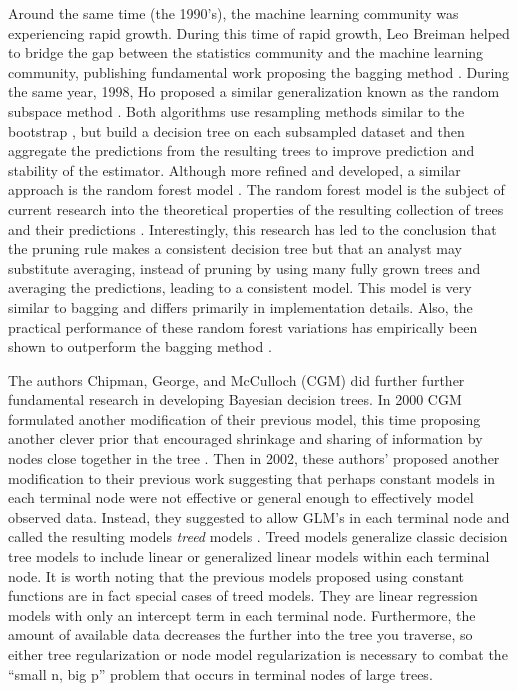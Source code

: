 Around the same time (the 1990's), the machine learning community was experiencing rapid growth. During this time of rapid growth, Leo Breiman helped to bridge the gap between the statistics community and the machine learning community, publishing fundamental work proposing the bagging method \cite{breiman1996bagging}. During the same year, 1998, Ho proposed a similar generalization known as the random subspace method \cite{ho1998random}. Both algorithms use resampling methods similar to the bootstrap \cite{efron1997improvements,efron1994introduction}, but build a decision tree on each subsampled dataset and then aggregate the predictions from the resulting trees to improve prediction and stability of the estimator. Although more refined and developed, a similar approach is the random forest model \cite{breiman2001random}. The random forest model is the subject of current research into the theoretical properties of the resulting collection of trees and their predictions \cite{biau2008consistency,biau2012analysis}. Interestingly, this research has led to the conclusion that the pruning rule makes a consistent decision tree but that an analyst may substitute averaging, instead of pruning by using many fully grown trees and averaging the predictions, leading to a consistent model.  This model is very similar to bagging and differs primarily in implementation details. Also, the practical performance of these random forest variations has empirically been shown to outperform the bagging method \cite{breiman2001random}. 

The authors Chipman, George, and McCulloch (CGM) \cite{chipman1998bayesian} did further further fundamental research in developing Bayesian decision trees. In 2000 CGM formulated another modification of their previous model, this time proposing another clever prior that encouraged shrinkage and sharing of information by nodes close together in the tree \cite{chipman2000hierarchical}. Then in 2002, these authors' proposed another modification to their previous work suggesting that perhaps constant models in each terminal node were not effective or general enough to effectively model observed data. Instead, they suggested to allow GLM's in each terminal node and called the resulting models \emph{treed} models \cite{chipman2002bayesian}. Treed models generalize classic decision tree models to include linear or generalized linear models within each terminal node. It is worth noting that the previous models proposed using constant functions are in fact special cases of treed models. They are linear regression models with only an intercept term in each terminal node. Furthermore, the amount of available data decreases the further into the tree you traverse, so either tree regularization or node model regularization is necessary to combat the ``small n, big p'' problem that occurs in terminal nodes of large trees. 


